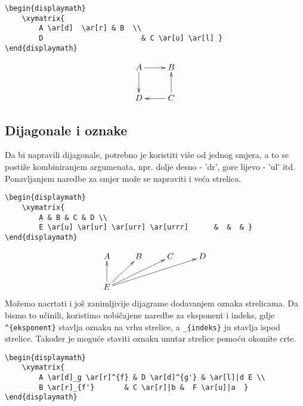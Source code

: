 \documentclass{article}
\begin{document}
\begin{verbatim}
\begin{displaymath}
    \xymatrix{
        A \ar[d]  \ar[r] & B  \\
        D                       & C \ar[u] \ar[l] }
\end{displaymath}
\end{verbatim}



\begin{displaymath}
    \xymatrix{
        A \ar[d] \ar[r] & B \\
        D    & C \ar[u] \ar[l] }
\end{displaymath}


\subsection{Dijagonale i oznake}
\justify
Da bi napravili dijagonale, potrebno je koristiti više od jednog smjera, a to se postiže kombiniranjem argumenata, npr. dolje desno - 'dr', gore lijevo - 'ul' itd. Ponavljanjem naredbe za smjer može se napraviti i veća strelica.


\begin{verbatim}
\begin{displaymath}
    \xymatrix{
        A & B & C & D \\
        E \ar[u] \ar[ur] \ar[urr] \ar[urrr]      &  &  & }
\end{displaymath}
\end{verbatim}

\begin{displaymath}
    \xymatrix{
        A & B & C & D \\
        E \ar[u] \ar[ur] \ar[urr] \ar[urrr]      &  &  & }
\end{displaymath}
\newpage
Možemo nacrtati i još zanimljivije dijagrame dodavanjem oznaka strelicama. Da bismo to učinili, koristimo uobičajene naredbe za eksponent i indeks, gdje \verb|^{eksponent}| stavlja oznaku na vrhu strelice, a \verb|_{indeks}| ju stavlja ispod strelice. Također je moguće staviti oznaku unutar strelice pomoću okomite crte.

\begin{verbatim}
\begin{displaymath}
    \xymatrix{
        A \ar[d]_g \ar[r]^{f} & D \ar[d]^{g'} & \ar[l]|d E \\
        B \ar[r]_{f'}       & C \ar[r]|b &  F \ar[u]|a  }
\end{displaymath}
\end{verbatim}
\end{document}
